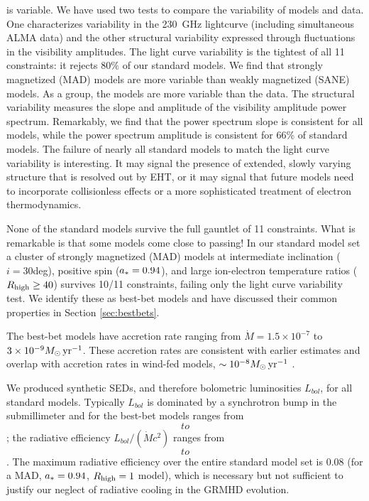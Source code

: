 \sgra is variable.  We have used two tests to compare the variability of models and data. One characterizes variability in the 230~GHz lightcurve (including simultaneous ALMA data) and the other structural variability expressed through fluctuations in the visibility amplitudes.  The light curve variability is the tightest of all 11 constraints: it rejects $80\%$ of our standard models.  We find that strongly magnetized (MAD) models are more variable than weakly magnetized (SANE) models.  As a group, the models are more variable than the data.  The structural variability measures the slope and amplitude of the visibility amplitude power spectrum.  Remarkably, we find that the power spectrum slope is consistent for all models, while the power spectrum amplitude is consistent for 66\% of standard models.  The failure of nearly all standard models to match the light curve variability is interesting.  It may signal the presence of extended, slowly varying structure that is resolved out by EHT, or it may signal that future models need to incorporate collisionless effects or a more sophisticated treatment of electron thermodynamics.   

None of the standard models survive the full gauntlet of 11 constraints.  What is remarkable is that some models come close to passing!  In our standard model set a cluster of strongly magnetized (MAD) models at intermediate inclination ($i = 30$deg), positive spin ($a_* = 0.94$), and large ion-electron temperature ratios ($R_\mathrm{high} \ge 40$) survives 10/11 constraints, failing only the light curve variability test.  We identify these as best-bet models and have discussed their common properties in Section \ref{sec:bestbets}.

The best-bet models have accretion rate ranging from $\dot{M} = 1.5 \times 10^{-7}$ to $3 \times 10^{-9} M_\odot \,\mathrm{yr}^{-1}$.  These accretion rates are consistent with earlier estimates and overlap with accretion rates in wind-fed models, $\sim 10^{-8} M_\odot\,\mathrm{yr}^{-1}$ \citep{2020ApJ...896L...6R}.  

We produced synthetic SEDs, and therefore bolometric luminosities $L_{bol}$, for all  standard models.  Typically $L_{bol}$ is dominated by a synchrotron bump in the submillimeter and for the best-bet models ranges from $$ to $$; the radiative  efficiency $L_{bol}/(\dot{M} c^2)$ ranges from $$ to $$.  The maximum radiative efficiency over the entire standard model set is $0.08$ (for a MAD, $a_* = 0.94$, $R_\mathrm{high} = 1$ model), which is necessary but not sufficient to justify our neglect of radiative cooling in the GRMHD evolution.  

